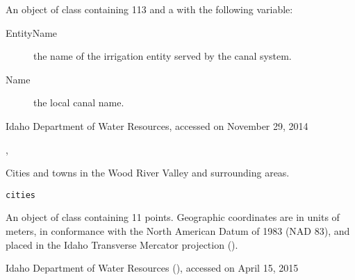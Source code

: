 \documentclass[letterpaper]{book}
\begin{document}
%
\begin{Format}
An object of  class containing 113  and a  with the following variable:
\begin{description}

\item[EntityName] the name of the irrigation entity served by the canal system.
\item[Name] the local canal name.

\end{description}

\end{Format}
%
\begin{Source}\relax
Idaho Department of Water Resources, accessed on November 29, 2014
\end{Source}
%
\begin{SeeAlso}\relax
{}, 
\end{SeeAlso}
%
\begin{Examples}
\end{Examples}
%
\begin{Description}\relax
Cities and towns in the Wood River Valley and surrounding areas.
\end{Description}
%
\begin{Usage}
\begin{verbatim}
cities
\end{verbatim}
\end{Usage}
%
\begin{Format}
An object of  class containing 11 points.
Geographic coordinates are in units of meters, in conformance with the North American Datum of 1983 (NAD 83), and placed in the
Idaho Transverse Mercator projection ().
\end{Format}
%
\begin{Source}\relax
Idaho Department of Water Resources (), accessed on April 15, 2015
\end{Source}
%
\begin{Examples}
\end{Examples}
\end{document}
